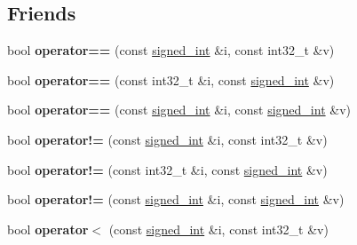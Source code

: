 \subsection*{Friends}
\begin{DoxyCompactItemize}
\item 
\mbox{\label{structfc_1_1signed__int_a7e5690c7ad2505e2297e0e536a3ad740}} 
bool {\bfseries operator==} (const \mbox{\hyperlink{structfc_1_1signed__int}{signed\+\_\+int}} \&i, const int32\+\_\+t \&v)
\item 
\mbox{\label{structfc_1_1signed__int_aec106017391627bd0e273592c18a0eb5}} 
bool {\bfseries operator==} (const int32\+\_\+t \&i, const \mbox{\hyperlink{structfc_1_1signed__int}{signed\+\_\+int}} \&v)
\item 
\mbox{\label{structfc_1_1signed__int_a5612a3dbcbfd3d1fa335aa402c29ac35}} 
bool {\bfseries operator==} (const \mbox{\hyperlink{structfc_1_1signed__int}{signed\+\_\+int}} \&i, const \mbox{\hyperlink{structfc_1_1signed__int}{signed\+\_\+int}} \&v)
\item 
\mbox{\label{structfc_1_1signed__int_a3ee2f31815a95ec9ffd2ab7a7f02d524}} 
bool {\bfseries operator!=} (const \mbox{\hyperlink{structfc_1_1signed__int}{signed\+\_\+int}} \&i, const int32\+\_\+t \&v)
\item 
\mbox{\label{structfc_1_1signed__int_a6abfcdc55171168e5679ccd9f37ba471}} 
bool {\bfseries operator!=} (const int32\+\_\+t \&i, const \mbox{\hyperlink{structfc_1_1signed__int}{signed\+\_\+int}} \&v)
\item 
\mbox{\label{structfc_1_1signed__int_a6e25feb014836d0288a262e5d488533c}} 
bool {\bfseries operator!=} (const \mbox{\hyperlink{structfc_1_1signed__int}{signed\+\_\+int}} \&i, const \mbox{\hyperlink{structfc_1_1signed__int}{signed\+\_\+int}} \&v)
\item 
\mbox{\label{structfc_1_1signed__int_adbae5ebcac1cb6ed6a7547a427c7cf95}} 
bool {\bfseries operator$<$} (const \mbox{\hyperlink{structfc_1_1signed__int}{signed\+\_\+int}} \&i, const int32\+\_\+t \&v)
\item 

\end{DoxyCompactItemize}
